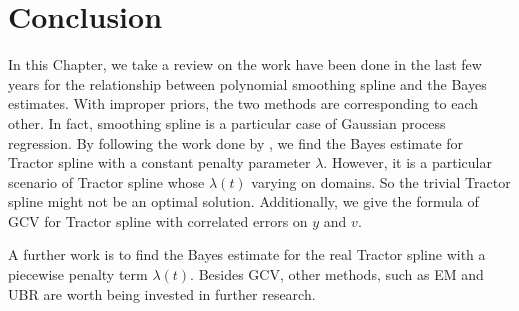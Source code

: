 \section{Conclusion}

In this Chapter, we take a review on the work have been done in the last few years for the relationship between polynomial smoothing spline and the Bayes estimates. With improper priors, the two methods are corresponding to each other. In fact, smoothing spline is a particular case of Gaussian process regression. By following the work done by \cite{gu2013smoothing}, we find the Bayes estimate for Tractor spline with a constant penalty parameter $\lambda$.  However, it is a particular scenario of Tractor spline whose $\lambda(t)$ varying on domains. So the trivial Tractor spline might not be an optimal solution. Additionally, we give the formula of GCV for Tractor spline with correlated errors on $y$ and $v$. 


A further work is to find the Bayes estimate for the real Tractor spline with a piecewise penalty term $\lambda(t)$. Besides GCV, other methods, such as EM and UBR are worth being invested in further research. 








